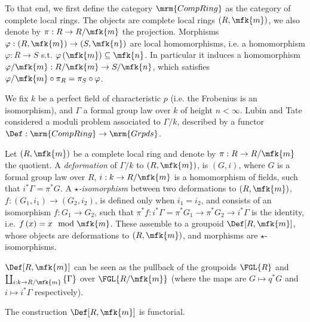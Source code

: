 To that end, we first define the category $\mrm{CompRing}$ as the category of complete local rings.
The objects are complete local rings $\left(R, \mfk{m}\right)$, we also denote by $\pi: R \to R/\mfk{m}$ the projection.
Morphisms $\varphi: \left(R, \mfk{m}\right) \to \left(S, \mfk{n}\right)$ are local homomorphisms, i.e. a homomorphism $\varphi: R \to S$ s.t. $\varphi\left(\mfk{m}\right) \subseteq \mfk{n}$.
In particular it induces a homomorphism $\varphi/\mfk{m}: R/\mfk{m} \to S/\mfk{n}$, which satisfies $\varphi/\mfk{m} \circ \pi_R = \pi_S \circ \varphi$.

We fix $k$ be a perfect field of characteristic $p$ (i.e. the Frobenius is an isomorphism), and $\Gamma$ a formal group law over $k$ of height $n < \infty$.
Lubin and Tate \cite{LT} considered a moduli problem associated to $\Gamma/k$, described by a functor $\Def: \mrm{CompRing} \to \mrm{Grpds}$.

\begin{definition}
	Let $\left(R, \mfk{m}\right)$ be a complete local ring and denote by $\pi: R \to R/\mfk{m}$ the quotient.
	A \emph{deformation} of $\Gamma/k$ to $\left(R, \mfk{m}\right)$, is $\left(G, i\right)$, where $G$ is a formal group law over $R$, $i: k \to R/\mfk{m}$ is a homomorphism of fields, such that $i^* \Gamma = \pi^* G$.
	A \emph{$\star$-isomorphism} between two deformations to $\left(R, \mfk{m}\right)$, $f: \left(G_1, i_1\right) \to \left(G_2, i_2\right)$, is defined only when $i_1 = i_2$, and consists of an isomorphism $f: G_1 \to G_2$, such that $\pi^* f: i^*\Gamma = \pi^* G_1 \to \pi^* G_2 \to i^*\Gamma$ is the identity, i.e. $f\left(x\right) = x \mod \mfk{m}$.
	These assemble to a groupoid $\Def[R, \mfk{m}]$, whose objects are deformations to $\left(R, \mfk{m}\right)$, and morphisms are $\star$-isomorphisms.
\end{definition}

\begin{remark}
	$\Def[R, \mfk{m}]$ can be seen as the pullback of the groupoids $\FGL{R}$ and $\coprod_{i: k \to R/\mfk{m}} \left\{\Gamma\right\}$ over $\FGL{R/\mfk{m}}$ (where the maps are $G \mapsto q^* G$ and $i \mapsto i^* \Gamma$ respectively).
\end{remark}

\begin{proposition}[/definition]
	The construction $\Def[R, \mfk{m}]$ is functorial.
\end{proposition}


